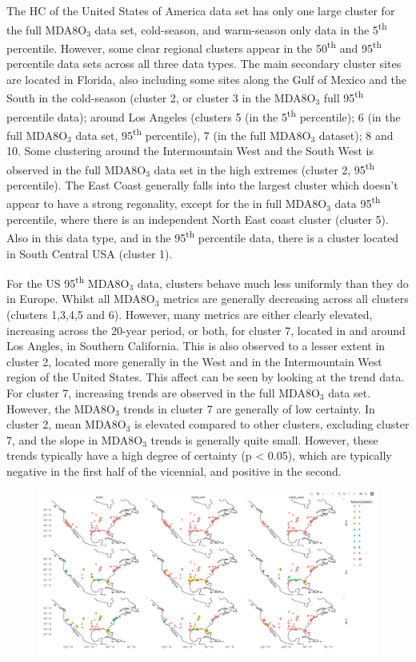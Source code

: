 \documentclass[journal abbreviation, manuscript]{copernicus}
\begin{document}
The HC of the United States of America data set has only one large cluster for the full MDA8O$_3$ data set, cold-season, and warm-season only data in the 5\textsuperscript{th} percentile. However, some clear regional clusters appear in the 50\textsuperscript{th} and 95\textsuperscript{th} percentile data sets across all three data types. The main secondary cluster sites are located in Florida, also including some sites along the Gulf of Mexico and the South in the cold-season (cluster 2, or cluster 3 in the MDA8O$_3$ full 95\textsuperscript{th} percentile data); around Los Angeles (clusters 5 (in the 5\textsuperscript{th} percentile); 6 (in the full MDA8O$_3$ data set, 95\textsuperscript{th} percentile), 7 (in the full MDA8O$_3$ dataset); 8 and 10. Some clustering around the Intermountain West and the South West is observed in the full MDA8O$_3$ data set in the high extremes (cluster 2, 95\textsuperscript{th} percentile). The East Coast generally falls into the largest cluster which doesn't appear to have a strong regonality, except for the in full MDA8O$_3$ data 95\textsuperscript{th} percentile, where there is an independent North East coast cluster (cluster 5). Also in this data type, and in the 95\textsuperscript{th} percentile data, there is a cluster located in South Central USA (cluster 1).

For the US 95\textsuperscript{th} MDA8O$_3$ data, clusters behave much less uniformly than they do in Europe. Whilst all MDA8O$_3$ metrics are generally decreasing across all clusters (clusters 1,3,4,5 and 6). However, many metrics are either clearly elevated, increasing across the 20-year period, or both, for cluster 7, located in and around Los Angles, in Southern California. This is also observed to a lesser extent in cluster 2, located more generally in the West and in the Intermountain West region of the United States. This affect can be seen by looking at the trend data. For cluster 7, increasing trends are observed in the full MDA8O$_3$ data set. However, the MDA8O$_3$ trends in cluster 7 are generally of low certainty. In cluster 2, mean MDA8O$_3$ is elevated compared to other clusters, excluding cluster 7, and the slope in MDA8O$_3$ trends is generally quite small. However, these trends typically have a high degree of certainty (p < 0.05), which are typically negative in the first half of the vicennial, and positive in the second. 

\begin{figure}[h]
    \centering
    \includegraphics[width=1\linewidth]{figures//temporary_clusters/us_cluster.png}
\end{figure}
\end{document}
